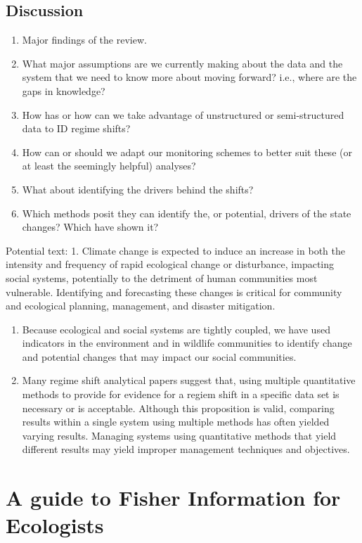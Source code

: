 \documentclass[12pt,twoside]{reedthesis}
\providecommand{\tightlist}{%
  \setlength{\itemsep}{0pt}\setlength{\parskip}{0pt}}
\def\labelenumi{\arabic{enumi}.}
\def\labelenumi{\arabic{enumi}.}
\begin{document}
\section{Discussion}\label{discussion}
\begin{enumerate}
\def\labelenumi{\arabic{enumi}.}
\tightlist
\item
  Major findings of the review.
\item
  What major assumptions are we currently making about the data and the
  system that we need to know more about moving forward? i.e., where are
  the gaps in knowledge?
\item
  How has or how can we take advantage of unstructured or
  semi-structured data to ID regime shifts?
\item
  How can or should we adapt our monitoring schemes to better suit these
  (or at least the seemingly helpful) analyses?
\item
  What about identifying the drivers behind the shifts?
\item
  Which methods posit they can identify the, or potential, drivers of
  the state changes? Which have shown it?
\end{enumerate}
Potential text: 1. Climate change is expected to induce an increase in
both the intensity and frequency of rapid ecological change or
disturbance, impacting social systems, potentially to the detriment of
human communities most vulnerable. Identifying and forecasting these
changes is critical for community and ecological planning, management,
and disaster mitigation.
\begin{enumerate}
\def\labelenumi{\arabic{enumi}.}
\item
  Because ecological and social systems are tightly coupled, we have
  used indicators in the environment and in wildlife communities to
  identify change and potential changes that may impact our social
  communities.
\item
  Many regime shift analytical papers suggest that, using multiple
  quantitative methods to provide for evidence for a regiem shift in a
  specific data set is necessary or is acceptable. Although this
  proposition is valid, comparing results within a single system using
  multiple methods has often yielded varying results. Managing systems
  using quantitative methods that yield different results may yield
  improper management techniques and objectives.
\end{enumerate}
\chapter{A guide to Fisher Information for Ecologists}\label{fiGuide}
\end{document}
